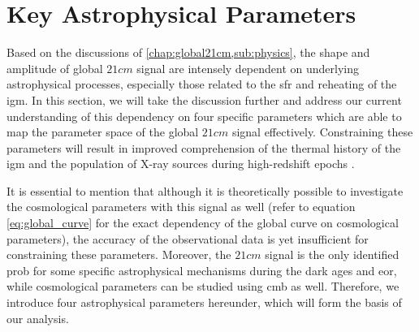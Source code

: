 \documentclass[12pt, TexShade, letterpaper]{report}
\begin{document}
\section{Key Astrophysical Parameters}
Based on the discussions of \ref{chap:global21cm,sub:physics}, the shape and amplitude of global $21cm$ signal are intensely dependent on underlying astrophysical processes, especially those related to the \gls{sfr} and reheating of the \gls{igm}. In this section, we will take the discussion further and address our current understanding of this dependency on four specific parameters which are able to map the parameter space of the global $21cm$ signal effectively. Constraining these parameters will result in improved comprehension of the thermal history of the \gls{igm} and the population of X-ray sources during high-redshift epochs \cite{21century}.\par
It is essential to mention that although it is theoretically possible to investigate the cosmological parameters with this signal as well (refer to equation \ref{eq:global_curve} for the exact dependency of the global curve on cosmological parameters), the accuracy of the observational data is yet insufficient for constraining these parameters. Moreover, the $21cm$ signal is the only identified prob for some specific astrophysical mechanisms during the dark ages and \gls{eor}, while cosmological parameters can be studied using \gls{cmb} as well. Therefore, we introduce four astrophysical parameters hereunder, which will form the basis of our analysis. \par
\end{document}

